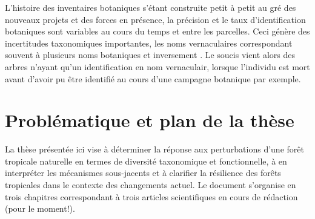 \documentclass[
  11pt,
  french,
  A4paper,
  extrafontsizes,onecolumn,openright
  ]{memoir}
\begin{document}
L'histoire des inventaires botaniques s'étant construite petit à petit
au gré des nouveaux projets et des forces en présence, la précision et
le taux d'identification botaniques sont variables au cours du temps et
entre les parcelles. Ceci génère des incertitudes taxonomiques
importantes, les noms vernaculaires correspondant souvent à plusieurs
noms botaniques et inversement \autocite{Oldeman1968}. Le soucis vient
alors des arbres n'ayant qu'un identification en nom vernaculair,
lorsque l'individu est mort avant d'avoir pu être identifié au cours
d'une campagne botanique par exemple.

\section{Problématique et plan de la
thèse}\label{problematique-et-plan-de-la-these}

La thèse présentée ici vise à déterminer la réponse aux perturbations
d'une forêt tropicale naturelle en termes de diversité taxonomique et
fonctionnelle, à en interpréter les mécanismes sous-jacents et à
clarifier la résilience des forêts tropicales dans le contexte des
changements actuel. Le document s'organise en trois chapitres
correspondant à trois articles scientifiques en cours de rédaction (pour
le moment!).
\end{document}
